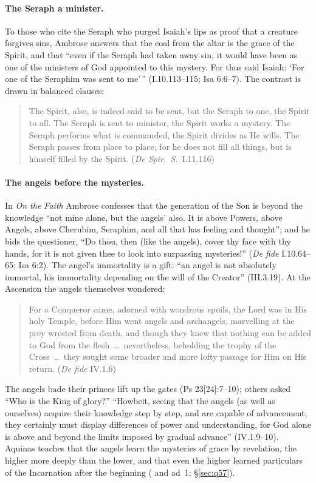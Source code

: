 \paragraph{The Seraph a minister.} To those who cite the Seraph who purged
Isaiah's lips as proof that a creature forgives sins, Ambrose answers that
the coal from the altar is the grace of the Spirit, and that ``even if the
Seraph had taken away sin, it would have been as one of the ministers of
God appointed to this mystery. For thus said Isaiah: `For one of the
Seraphim was sent to me'\,'' (I.10.113--115; Isa 6:6--7). The contrast is
drawn in balanced clauses:
\begin{quote}
The Spirit, also, is indeed said to be sent, but the Seraph to one, the
Spirit to all. The Seraph is sent to minister, the Spirit works a
mystery. The Seraph performs what is commanded, the Spirit divides as He
wills. The Seraph passes from place to place, for he does not fill all
things, but is himself filled by the Spirit. (\emph{De Spir.\ S.}\
I.11.116)
\end{quote}

\paragraph{The angels before the mysteries.} In \emph{On the Faith} Ambrose
confesses that the generation of the Son is beyond the knowledge ``not
mine alone, but the angels' also. It is above Powers, above Angels, above
Cherubim, Seraphim, and all that has feeling and thought''; and he bids
the questioner, ``Do thou, then (like the angels), cover thy face with thy
hands, for it is not given thee to look into surpassing mysteries!''
(\emph{De fide} I.10.64--65; Isa 6:2). The angel's immortality is a gift:
``an angel is not absolutely immortal, his immortality depending on the
will of the Creator'' (III.3.19). At the Ascension the angels themselves
wondered:
\begin{quote}
For a Conqueror came, adorned with wondrous spoils, the Lord was in His
holy Temple, before Him went angels and archangels, marvelling at the
prey wrested from death, and though they knew that nothing can be added
to God from the flesh~\dots\ nevertheless, beholding the trophy of the
Cross~\dots\ they sought some broader and more lofty passage for Him on
His return. (\emph{De fide} IV.1.6)
\end{quote}
\noindent The angels bade their princes lift up the gates (Ps
23[24]:7--10); others asked ``Who is the King of glory?'' ``Howbeit,
seeing that the angels (as well as ourselves) acquire their knowledge
step by step, and are capable of advancement, they certainly must display
differences of power and understanding, for God alone is above and beyond
the limits imposed by gradual advance'' (IV.1.9--10). Aquinas teaches that
the angels learn the mysteries of grace by revelation, the higher more
deeply than the lower, and that even the higher learned particulars of
the Incarnation after the beginning (\ST{I q.~57 a.~5} and ad~1;
\S\ref{sec:q57}).

